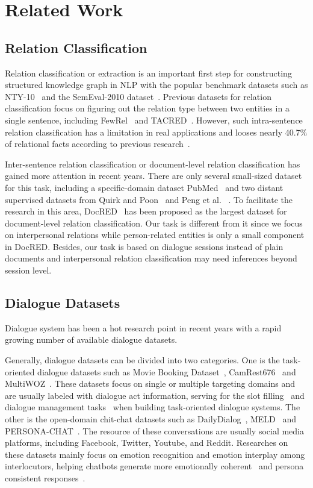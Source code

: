 \section{Related Work}

\subsection{Relation Classification}
Relation classification or extraction is an important first step for constructing structured knowledge graph in NLP with the popular benchmark datasets such as NTY-10~\cite{RiedelYM10} and the SemEval-2010 dataset~\cite{HendrickxKKNSPP10}. Previous datasets for relation classification focus on figuring out the relation type between two entities in a single sentence, including FewRel~\cite{HanZYWYLS18} and  TACRED~\cite{ZhangZCAM17}.  However, such intra-sentence relation classification has a limitation in real applications and looses nearly 40.7\% of relational facts according to previous research~\cite{SwampillaiS10,VergaSM18,YaoYLHLLLHZS19}.

Inter-sentence relation classification or document-level relation classification has gained more attention in recent years. There are only several small-sized dataset for this task, including a specific-domain dataset PubMed~\cite{LiSJSWLDMWL16} and two distant supervised datasets from Quirk and Poon~ and Peng et al. ~. To facilitate the research in this area, DocRED~\cite{YaoYLHLLLHZS19} has been proposed as the largest dataset for document-level relation classification. Our task is different from it since we focus on interpersonal relations while person-related entities is only a small component in DocRED. Besides, our task is based on dialogue sessions instead of plain documents and interpersonal relation classification may need inferences beyond session level.

\subsection{Dialogue Datasets}
Dialogue system has been a hot research point in recent years with a rapid growing number of available dialogue datasets. 

Generally, dialogue datasets can be divided into two categories. 
One is the task-oriented dialogue datasets such as Movie Booking Dataset~\cite{LiCLGC17}, CamRest676~\cite{UltesRSVKCBMWGY17} and MultiWOZ~\cite{BudzianowskiWTC18}. These datasets focus on single or multiple targeting domains and are usually labeled with dialogue act information, serving for the slot filling~\cite{LiuWXF20} and dialogue management tasks~\cite{BudzianowskiV19} when building task-oriented dialogue systems.
The other is the open-domain chit-chat datasets such as DailyDialog~\cite{LiSSLCN17}, MELD~\cite{PoriaHMNCM19} and PERSONA-CHAT~\cite{KielaWZDUS18}. The resource of these conversations are usually social media platforms, including Facebook, Twitter, Youtube, and Reddit. Researches on these datasets mainly focus on emotion recognition and emotion interplay among interlocutors, helping chatbots generate more emotionally coherent~\cite{GhosalMPCG19} and persona consistent responses~\cite{ZhengZHM20}.

